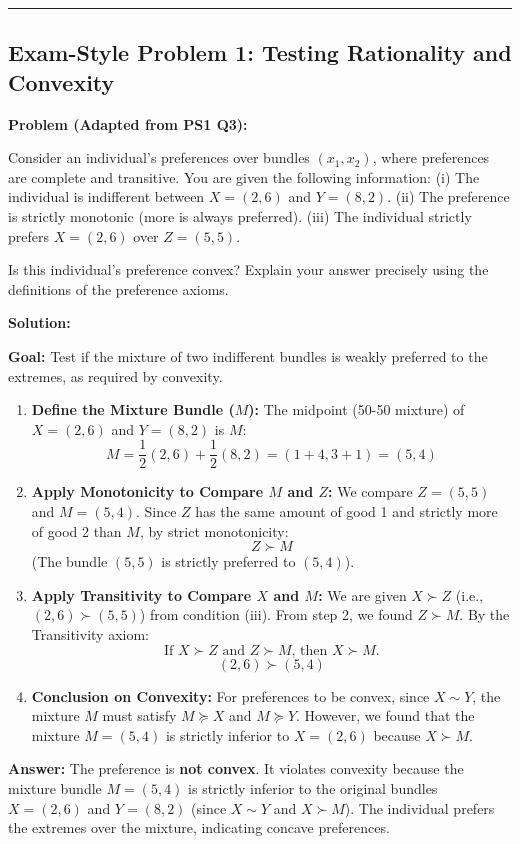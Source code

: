 \documentclass{article}
\begin{document}
\noindent\rule{\textwidth}{0.4pt}

\subsection*{Exam-Style Problem 1: Testing Rationality and Convexity}

\textbf{Problem (Adapted from PS1 Q3):}

Consider an individual's preferences over bundles $(x_1, x_2)$, where preferences are complete and transitive. You are given the following information: (i) The individual is indifferent between $X = (2, 6)$ and $Y = (8, 2)$. (ii) The preference is strictly monotonic (more is always preferred). (iii) The individual strictly prefers $X = (2, 6)$ over $Z = (5, 5)$.

Is this individual's preference convex? Explain your answer precisely using the definitions of the preference axioms.

\textbf{Solution:}

\textbf{Goal:} Test if the mixture of two indifferent bundles is weakly preferred to the extremes, as required by convexity.

\begin{enumerate}
    \item \textbf{Define the Mixture Bundle ($M$):} The midpoint (50-50 mixture) of $X=(2, 6)$ and $Y=(8, 2)$ is $M$: \[M = \frac{1}{2}(2, 6) + \frac{1}{2}(8, 2) = (1+4, 3+1) = (5, 4)\]
    \item \textbf{Apply Monotonicity to Compare $M$ and $Z$:} We compare $Z=(5, 5)$ and $M=(5, 4)$. Since $Z$ has the same amount of good 1 and strictly more of good 2 than $M$, by strict monotonicity: \[Z \succ M\] (The bundle $(5, 5)$ is strictly preferred to $(5, 4)$).
    \item \textbf{Apply Transitivity to Compare $X$ and $M$:} We are given $X \succ Z$ (i.e., $(2, 6) \succ (5, 5)$) from condition (iii). From step 2, we found $Z \succ M$. By the Transitivity axiom: \[\text{If } X \succ Z \text{ and } Z \succ M \text{, then } X \succ M.\] \[(2, 6) \succ (5, 4)\]
    \item \textbf{Conclusion on Convexity:} For preferences to be convex, since $X \sim Y$, the mixture $M$ must satisfy $M \succeq X$ and $M \succeq Y$. However, we found that the mixture $M=(5, 4)$ is strictly inferior to $X=(2, 6)$ because $X \succ M$.
\end{enumerate}

\textbf{Answer:} The preference is \textbf{not convex}. It violates convexity because the mixture bundle $M=(5, 4)$ is strictly inferior to the original bundles $X=(2, 6)$ and $Y=(8, 2)$ (since $X \sim Y$ and $X \succ M$). The individual prefers the extremes over the mixture, indicating concave preferences.
\end{document}
